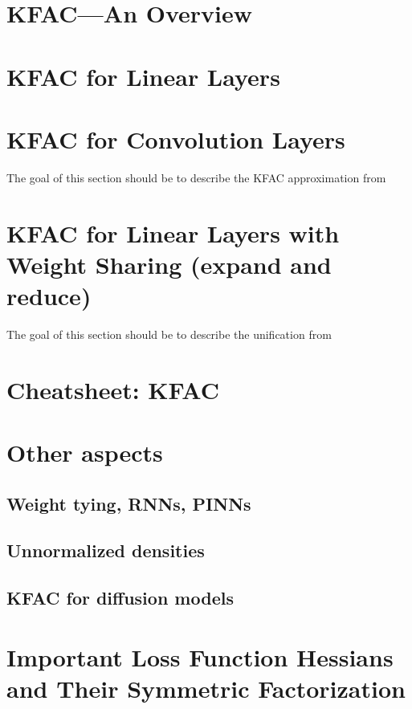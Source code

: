 \documentclass{article}
\begin{document}
\begin{paracol}{2}
  \section{KFAC---An Overview}
  

  \section{KFAC for Linear Layers}
  

  \section{KFAC for Convolution Layers}
  The goal of this section should be to describe the KFAC approximation from~\cite{grosse2016kroneckerfactored}

  \section{KFAC for Linear Layers with Weight Sharing (expand and reduce)}
  The goal of this section should be to describe the unification from~\cite{eschenhagen2023kroneckerfactored}

  \section{Cheatsheet: KFAC}

  \section{Other aspects}
  \subsection{Weight tying, RNNs, PINNs}
  \subsection{Unnormalized densities}
  \subsection{KFAC for diffusion models}

\end{paracol}

\clearpage


\appendix

\section{Important Loss Function Hessians and Their Symmetric Factorization}\label{app:loss_function_hessians}

\end{document}
